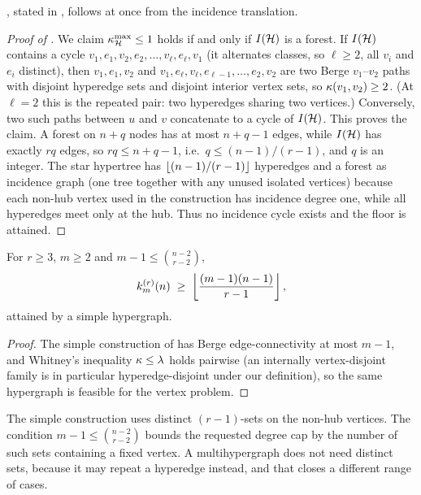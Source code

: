 , stated in , follows at once from
the incidence translation.

\begin{proof}[Proof of ]
We claim $\kappa^{\max}_{\mathcal{H}} \le 1$ holds if and only if $I(\mathcal{H})$ is a forest.
If $I(\mathcal{H})$ contains a cycle $v_1, e_1, v_2, e_2, \dots, v_\ell, e_\ell, v_1$
(it alternates classes, so $\ell \ge 2$, all $v_i$ and $e_i$ distinct), then
$v_1, e_1, v_2$ and $v_1, e_\ell, v_\ell, e_{\ell-1}, \dots, e_2, v_2$ are two
Berge $v_1$--$v_2$ paths with disjoint hyperedge sets and disjoint interior
vertex sets, so $\kappa(v_1, v_2) \ge 2$. (At $\ell = 2$ this is the repeated
pair: two hyperedges sharing two vertices.) Conversely, two such paths
between $u$ and $v$ concatenate to a cycle of $I(\mathcal{H})$. This proves the claim.
A forest on $n + q$ nodes has at most $n + q - 1$ edges, while $I(\mathcal{H})$ has
exactly $rq$ edges, so $rq \le n + q - 1$, i.e.\ $q \le (n-1)/(r-1)$, and $q$
is an integer. The star hypertree has $\left\lfloor (n-1)/(r-1) \right\rfloor$ hyperedges and a
forest as incidence graph (one tree together with any unused isolated vertices)
because each non-hub vertex used in the construction has incidence degree one, while all hyperedges meet only at the hub. Thus no incidence cycle exists and the floor is attained.
\end{proof}

\begin{proposition}\label{prop:hyper-vertex-lower}
For $r \ge 3$, $m \ge 2$ and $m - 1 \le \binom{n-2}{r-2}$,
\[
    k_m^{(r)}(n) \;\ge\; \left\lfloor \frac{(m-1)(n-1)}{r-1} \right\rfloor,
\]
attained by a simple hypergraph.
\end{proposition}

\begin{proof}
The simple construction of  has Berge
edge-connectivity at most $m-1$, and Whitney's inequality
$\kappa \le \lambda$ holds pairwise (an internally vertex-disjoint family is in
particular hyperedge-disjoint under our definition), so the same hypergraph
is feasible for the vertex problem.
\end{proof}

The simple construction uses distinct $(r-1)$-sets on the non-hub vertices. The condition $m-1\le\binom{n-2}{r-2}$ bounds the requested degree cap by the number of such sets containing a fixed vertex. A multihypergraph does not need distinct sets, because it
may repeat a hyperedge instead, and that closes a different range of cases.

